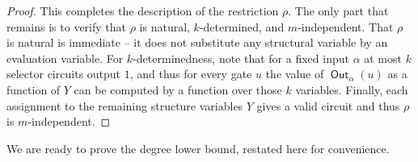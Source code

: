 \documentclass[10pt,a4paper]{article}
\theoremstyle{plain}
\theoremstyle{remark}
\theoremstyle{definition}
\newcommand{\vars}[1]{\mathsf{#1}}
\DeclareMathOperator{\outwire}{\vars{Out}}
\begin{document}
\begin{proof}
  This completes the description of the restriction $\rho$.  The only
  part that remains is to verify that $\rho$ is natural,
  $k$-determined, and $m$-independent.  That $\rho$ is natural is
  immediate -- it does not substitute any structural variable by an
  evaluation variable.  For $k$-determinedness, note that for a fixed
  input $\alpha$ at most $k$ selector circuits output $1$, and thus
  for every gate $u$ the value of $\outwire_\alpha(u)$ as a function
  of $Y$ can be computed by a function over those $k$ variables.
  Finally, each assignment to the remaining structure variables $Y$
  gives a valid circuit and thus $\rho$ is $m$-independent.
\end{proof}

We are ready to prove the degree lower bound, restated here for
convenience.

\MainDegree*
\end{document}
